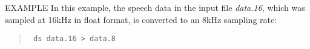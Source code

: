 \begin{options}
\end{options}

\begin{qsection}{EXAMPLE}
In this example, the speech data in the input file {\em data.16},
which was sampled at 16kHz in float format, is converted to
an 8kHz sampling rate:
\begin{quote}
\verb! ds data.16 > data.8 !
\end{quote}
\end{qsection}

%
